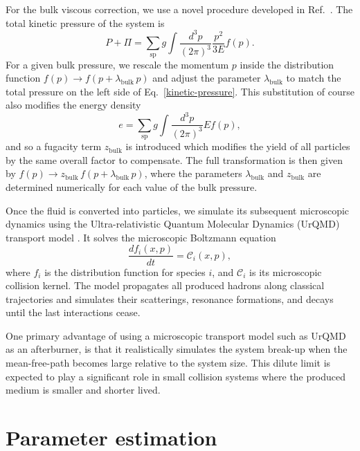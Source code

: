 \documentclass[aps,prc,reprint,amsmath,nofootinbib]{revtex4-1}
\begin{document}
For the bulk viscous correction, we use a novel procedure developed in Ref.~\cite{Bernhard:2018hnz}.
The total kinetic pressure of the system is
\begin{equation}
  \label{kinetic-pressure}
  P + \Pi = \sum\limits_\mathrm{sp} g \int \frac{d^3p}{(2\pi)^3} \frac{p^2}{3E} f(p).
\end{equation}
For a given bulk pressure, we rescale the momentum $p$ inside the distribution function $f(p) \rightarrow f(p + \lambda_\mathrm{bulk}\, p)$ and adjust the parameter $\lambda_\mathrm{bulk}$ to match the total pressure on the left side of Eq.~\eqref{kinetic-pressure}.
This substitution of course also modifies the energy density
\begin{equation}
  e = \sum\limits_\mathrm{sp} g \int \frac{d^3p}{(2 \pi)^3} E f(p),
\end{equation}
and so a fugacity term $z_\mathrm{bulk}$ is introduced which modifies the yield of all particles by the same overall factor to compensate.
The full transformation is then given by $f(p) \rightarrow z_\mathrm{bulk}\, f(p + \lambda_\mathrm{bulk}\, p)$, where the parameters $\lambda_\mathrm{bulk}$ and $z_\mathrm{bulk}$ are determined numerically for each value of the bulk pressure.

Once the fluid is converted into particles, we simulate its subsequent microscopic dynamics using the Ultra-relativistic Quantum Molecular Dynamics (UrQMD) transport model \cite{Bass:1998ca, Bleicher:1999xi}.
It solves the microscopic Boltzmann equation
\begin{equation}
  \frac{df_i(x, p)}{dt} = \mathcal{C}_i(x, p),
\end{equation}
where $f_i$ is the distribution function for species $i$, and $\mathcal{C}_i$ is its microscopic collision kernel.
The model propagates all produced hadrons along classical trajectories and simulates their scatterings, resonance formations, and decays until the last interactions cease.

One primary advantage of using a microscopic transport model such as UrQMD as an afterburner, is that it realistically simulates the system break-up when the mean-free-path becomes large relative to the system size.
This dilute limit is expected to play a significant role in small collision systems where the produced medium is smaller and shorter lived.

\section{Parameter estimation}
\label{sec:calibration}
\end{document}
